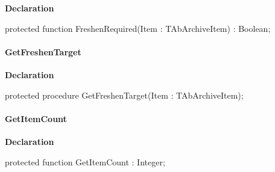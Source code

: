 \documentclass{report}
\newif\ifpdf
\begin{document}
\label{AbArcTyp.TAbArchive-FreshenRequired}
\begin{list}{}{
\setlength{\itemindent}{0cm}
\setlength{\listparindent}{0cm}
\setlength{\leftmargin}{\evensidemargin}
\addtolength{\leftmargin}{\tmplength}
\settowidth{\labelsep}{X}
\addtolength{\leftmargin}{\labelsep}
\setlength{\labelwidth}{\tmplength}
}
\item[\textbf{Declaration}\hfill]
\ifpdf
\begin{flushleft}
\fi
\begin{ttfamily}
protected function FreshenRequired(Item : TAbArchiveItem) : Boolean;\end{ttfamily}

\ifpdf
\end{flushleft}
\fi

\end{list}
\paragraph*{GetFreshenTarget}\hspace*{\fill}

\label{AbArcTyp.TAbArchive-GetFreshenTarget}
\begin{list}{}{
\setlength{\itemindent}{0cm}
\setlength{\listparindent}{0cm}
\setlength{\leftmargin}{\evensidemargin}
\addtolength{\leftmargin}{\tmplength}
\settowidth{\labelsep}{X}
\addtolength{\leftmargin}{\labelsep}
\setlength{\labelwidth}{\tmplength}
}
\item[\textbf{Declaration}\hfill]
\ifpdf
\begin{flushleft}
\fi
\begin{ttfamily}
protected procedure GetFreshenTarget(Item : TAbArchiveItem);\end{ttfamily}

\ifpdf
\end{flushleft}
\fi

\end{list}
\paragraph*{GetItemCount}\hspace*{\fill}

\label{AbArcTyp.TAbArchive-GetItemCount}
\begin{list}{}{
\setlength{\itemindent}{0cm}
\setlength{\listparindent}{0cm}
\setlength{\leftmargin}{\evensidemargin}
\addtolength{\leftmargin}{\tmplength}
\settowidth{\labelsep}{X}
\addtolength{\leftmargin}{\labelsep}
\setlength{\labelwidth}{\tmplength}
}
\item[\textbf{Declaration}\hfill]
\ifpdf
\begin{flushleft}
\fi
\begin{ttfamily}
protected function GetItemCount : Integer;\end{ttfamily}

\ifpdf
\end{flushleft}
\fi

\end{list}
\end{document}
